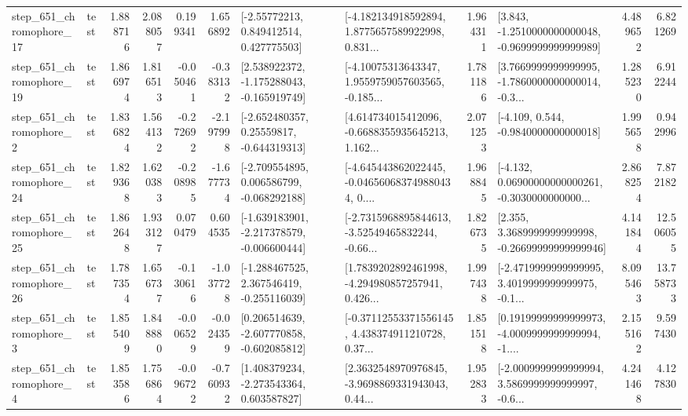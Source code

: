 \begin{tabular}{llrrrrllrlrr}
  step\_651\_chromophore\_17 &      test &      1.888716 &    2.088057 &      0.199341 &  1.656892 &     [-2.55772213, 0.849412514, 0.427775503] &  [-4.182134918592894, 1.8775657589922998, 0.831... &       1.964311 &  [3.843, -1.2510000000000048, -0.9699999999999989] &            4.489652 &          6.821269 \\
  step\_651\_chromophore\_19 &      test &      1.866974 &    1.816513 &     -0.050461 & -0.383132 &   [2.538922372, -1.175288043, -0.165919749] &  [-4.10075313643347, 1.9559759057603565, -0.185... &       1.781186 &  [3.7669999999999995, -1.7860000000000014, -0.3... &            1.285230 &          6.912244 \\
   step\_651\_chromophore\_2 &      test &      1.836824 &    1.564132 &     -0.272692 & -2.197998 &    [-2.652480357, 0.25559817, -0.644319313] &  [4.614734015412096, -0.6688355935645213, 1.162... &       2.071253 &               [-4.109, 0.544, -0.9840000000000018] &            1.995658 &          0.942996 \\
  step\_651\_chromophore\_24 &      test &      1.829368 &    1.620383 &     -0.208985 & -1.677734 &   [-2.709554895, 0.006586799, -0.068292188] &  [-4.645443862022445, -0.046560683749880434, 0.... &       1.968845 &  [-4.132, 0.06900000000000261, -0.3030000000000... &            2.868254 &          7.872182 \\
  step\_651\_chromophore\_25 &      test &      1.862648 &    1.933127 &      0.070479 &  0.604535 &  [-1.639183901, -2.217378579, -0.006600444] &  [-2.7315968895844613, -3.52549465832244, -0.66... &       1.826735 &  [2.355, 3.3689999999999998, -0.26699999999999946] &            4.141844 &         12.506055 \\
  step\_651\_chromophore\_26 &      test &      1.787354 &    1.656737 &     -0.130616 & -1.037728 &   [-1.288467525, 2.367546419, -0.255116039] &  [1.7839202892461998, -4.294980857257941, 0.426... &       1.997438 &  [-2.4719999999999995, 3.4019999999999975, -0.1... &            8.095463 &         13.758733 \\
   step\_651\_chromophore\_3 &      test &      1.855409 &    1.848880 &     -0.006529 & -0.024359 &   [0.206514639, -2.607770858, -0.602085812] &  [-0.37112553371556145, 4.438374911210728, 0.37... &       1.851518 &  [0.19199999999999973, -4.0009999999999994, -1.... &            2.155162 &          9.597430 \\
   step\_651\_chromophore\_4 &      test &      1.853586 &    1.756864 &     -0.096722 & -0.760932 &    [1.408379234, -2.273543364, 0.603587827] &  [2.3632548970976845, -3.9698869331943043, 0.44... &       1.952833 &  [-2.0009999999999994, 3.5869999999999997, -0.6... &            4.241468 &          4.127830 \\

\end{tabular}
